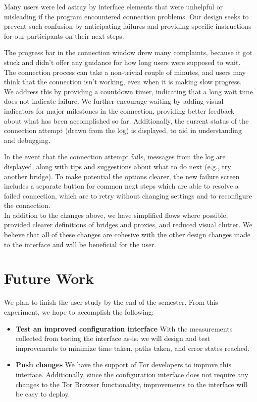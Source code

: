 \documentclass{template}
\begin{document}

Many users were led astray by interface elements that were unhelpful or
misleading if the program encountered connection problems. Our design seeks to
prevent such confusion by anticipating failures and providing specific instructions
for our participants on their next steps.

The progress bar in the connection window drew many complaints, because it got
stuck and didn't offer any guidance for how long users were supposed to wait. 
The connection process can take a non-trivial couple of minutes, and users may
think that the connection isn't working, even when it is making slow progress. We
address this by providing a countdown timer, indicating that a long wait time does
not indicate failure. We further encourage waiting by adding visual indicators
for major milestones in the connection, providing better feedback about what has
been accomplished so far. Additionally, the current status of the connection
attempt (drawn from the log) is displayed, to aid in understanding and
debugging.

In the event that the connection attempt fails, messages from the log are
displayed, along with tips and suggestions about what to do next (e.g., try
another bridge). To make potential the options clearer, the new failure screen
includes a separate button for common next steps which are able to resolve
a failed connection, which are to retry without changing settings and to reconfigure 
the connection. \\

In addition to the changes above, we have simplified flows where possible,
provided clearer definitions of bridges and proxies, and reduced visual clutter.
We believe that all of these changes are cohesive with the other design changes
made to the interface and will be beneficial for the user.

\section{Future Work}

We plan to finish the user study by the end of the semester. 
From this experiment, we hope to accomplish the following: 

\begin{itemize} \itemsep1pt \parskip0pt  
\item {\bfseries Test an improved configuration interface} With the measurements collected
from testing the interface as-is, we will design and test improvements to minimize
time taken, paths taken, and error states reached.
\item {\bfseries Push changes} We have the support of Tor developers
to improve this interface. Additionally, since the configuration interface does not require 
any changes to the Tor Browser functionality, improvements to the interface will
be easy to deploy. 
\end{itemize}
\end{document}

